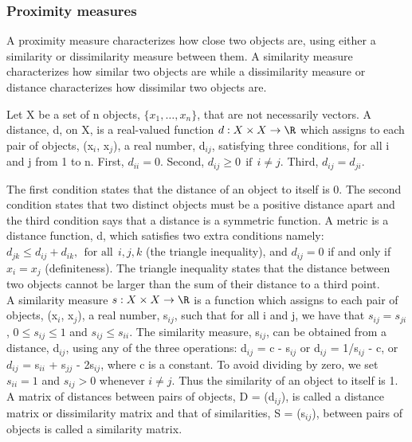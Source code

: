 \subsubsection{Proximity measures}
A proximity measure characterizes how close two objects are, using
either a similarity or dissimilarity measure between them.
A similarity measure characterizes how similar two objects are while
a dissimilarity measure or distance characterizes how dissimilar two objects are.
\begin{Def}\label{distance}
Let X be a set of n objects, $\{x_{1}, \dots, x_{n}\}$, that are not necessarily vectors. A distance, d, on X, is a real-valued  function
$d: X \times X \rightarrow  \R$ which assigns to each pair of objects, (x$_{i}$, x$_{j}$), a real number, d$_{ij}$, satisfying three conditions, for all i and j from 1 to n. First, $d_{ii} = 0.$ Second, $d_{ij} \geq 0\ \  \text{if}\ \ i \neq j$. Third, $d_{ij} = d_{ji}.$
\end{Def}

The first condition states that the distance of an object to itself is 0.
The second condition states that two distinct objects must be a positive distance apart and the third condition says that a distance is a symmetric function.
A metric is a distance function, d, which satisfies two extra conditions namely:
$d_{jk} \leq d_{ij} + d_{ik}, \ \ \text{for all}\ \ i,j,k$ (the triangle inequality), and $d_{ij} = 0$ if and only if  $x_{i} = x_{j}$ (definiteness). The triangle inequality states that the distance between two objects cannot be larger than the sum of their distance to a third point.\\

A similarity measure $s: X \times X \rightarrow  \R$ is a function which assigns to each pair of objects, (x$_{i}$, x$_{j}$), a real number, s$_{ij}$, such that
for all i and j, we have that
$s_{ij} = s_{ji}$, $0 \leq s_{ij} \leq 1$ and $s_{ij} \leq s_{ii}$.
The similarity measure, s$_{ij}$, can be obtained from a distance, d$_{ij}$, using any of the three operations: d$_{ij}$ = c - s$_{ij}$ or  d$_{ij}$ = 1/s$_{ij}$ - c, or $d_{ij}$ = s$_{ii}$ + s$_{jj}$ - 2s$_{ij}$,
where c is a constant.
To avoid dividing by zero, we set $s_{ii} = 1$ and $s_{ij} > 0$ whenever $i \neq j$. Thus the similarity of an object to itself is 1.
A matrix of distances between pairs of objects, D = (d$_{ij}$), is called a distance matrix or dissimilarity matrix and that of similarities, S = (s$_{ij}$), between pairs of objects is called a similarity matrix.

